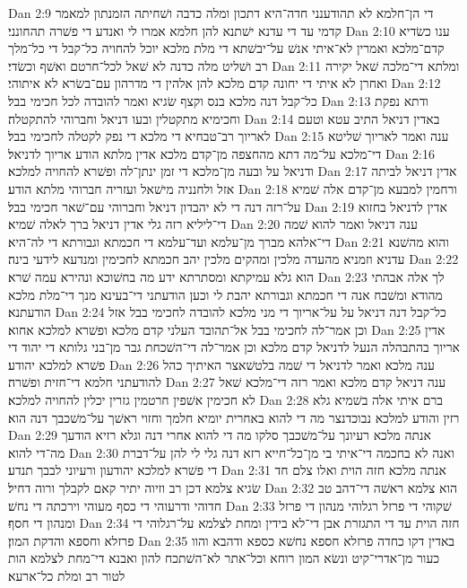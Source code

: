 Dan 2:9  די הן־חלמא לא תהודענני חדה־היא דתכון ומלה כדבה ושׁחיתה הזמנתון למאמר קדמי עד די עדנא ישׁתנא להן חלמא אמרו לי ואנדע די פשׁרה תהחונני׃
Dan 2:10  ענו כשׂדיא קדם־מלכא ואמרין לא־איתי אנשׁ על־יבשׁתא די מלת מלכא יוכל להחויה כל־קבל די כל־מלך רב ושׁליט מלה כדנה לא שׁאל לכל־חרטם ואשׁף וכשׂדי׃
Dan 2:11  ומלתא די־מלכה שׁאל יקירה ואחרן לא איתי די יחונה קדם מלכא להן אלהין די מדרהון עם־בשׂרא לא איתוהי׃
Dan 2:12  כל־קבל דנה מלכא בנס וקצף שׂגיא ואמר להובדה לכל חכימי בבל׃
Dan 2:13  ודתא נפקת וחכימיא מתקטלין ובעו דניאל וחברוהי להתקטלה׃
Dan 2:14  באדין דניאל התיב עטא וטעם לאריוך רב־טבחיא די מלכא די נפק לקטלה לחכימי בבל׃
Dan 2:15  ענה ואמר לאריוך שׁליטא די־מלכא על־מה דתא מהחצפה מן־קדם מלכא אדין מלתא הודע אריוך לדניאל׃
Dan 2:16  ודניאל על ובעה מן־מלכא די זמן ינתן־לה ופשׁרא להחויה למלכא׃
Dan 2:17  אדין דניאל לביתה אזל ולחנניה מישׁאל ועזריה חברוהי מלתא הודע׃
Dan 2:18  ורחמין למבעא מן־קדם אלה שׁמיא על־רזה דנה די לא יהבדון דניאל וחברוהי עם־שׁאר חכימי בבל׃
Dan 2:19  אדין לדניאל בחזוא די־ליליא רזה גלי אדין דניאל ברך לאלה שׁמיא׃
Dan 2:20  ענה דניאל ואמר להוא שׁמה די־אלהא מברך מן־עלמא ועד־עלמא די חכמתא וגבורתא די לה־היא׃
Dan 2:21  והוא מהשׁנא עדניא וזמניא מהעדה מלכין ומהקים מלכין יהב חכמתא לחכימין ומנדעא לידעי בינה׃
Dan 2:22  הוא גלא עמיקתא ומסתרתא ידע מה בחשׁוכא ונהירא עמה שׁרא׃
Dan 2:23  לך אלה אבהתי מהודא ומשׁבח אנה די חכמתא וגבורתא יהבת לי וכען הודעתני די־בעינא מנך די־מלת מלכא הודעתנא׃
Dan 2:24  כל־קבל דנה דניאל על על־אריוך די מני מלכא להובדה לחכימי בבל אזל וכן אמר־לה לחכימי בבל אל־תהובד העלני קדם מלכא ופשׁרא למלכא אחוא׃
Dan 2:25  אדין אריוך בהתבהלה הנעל לדניאל קדם מלכא וכן אמר־לה די־השׁכחת גבר מן־בני גלותא די יהוד די פשׁרא למלכא יהודע׃
Dan 2:26  ענה מלכא ואמר לדניאל די שׁמה בלטשׁאצר האיתיך כהל להודעתני חלמא די־חזית ופשׁרה׃
Dan 2:27  ענה דניאל קדם מלכא ואמר רזה די־מלכא שׁאל לא חכימין אשׁפין חרטמין גזרין יכלין להחויה למלכא׃
Dan 2:28  ברם איתי אלה בשׁמיא גלא רזין והודע למלכא נבוכדנצר מה די להוא באחרית יומיא חלמך וחזוי ראשׁך על־משׁכבך דנה הוא׃
Dan 2:29  אנתה מלכא רעיונך על־משׁכבך סלקו מה די להוא אחרי דנה וגלא רזיא הודעך מה־די להוא׃
Dan 2:30  ואנה לא בחכמה די־איתי בי מן־כל־חייא רזא דנה גלי לי להן על־דברת די פשׁרא למלכא יהודעון ורעיוני לבבך תנדע׃
Dan 2:31  אנתה מלכא חזה הוית ואלו צלם חד שׂגיא צלמא דכן רב וזיוה יתיר קאם לקבלך ורוה דחיל׃
Dan 2:32  הוא צלמא ראשׁה די־דהב טב חדוהי ודרעוהי די כסף מעוהי וירכתה די נחשׁ׃
Dan 2:33  שׁקוהי די פרזל רגלוהי מנהון די פרזל ומנהון די חסף׃
Dan 2:34  חזה הוית עד די התגזרת אבן די־לא בידין ומחת לצלמא על־רגלוהי די פרזלא וחספא והדקת המון׃
Dan 2:35  באדין דקו כחדה פרזלא חספא נחשׁא כספא ודהבא והוו כעור מן־אדרי־קיט ונשׂא המון רוחא וכל־אתר לא־השׁתכח להון ואבנא די־מחת לצלמא הות לטור רב ומלת כל־ארעא׃
